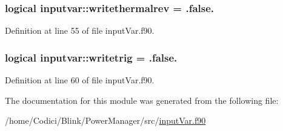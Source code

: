 \hypertarget{classinputvar_ae7817d3a1abb7e02fdd1d3f40b45a4e8}{
\subsubsection[{writethermalrev}]{\setlength{\rightskip}{0pt plus 5cm}logical inputvar\-::writethermalrev = .false.}}\label{classinputvar_ae7817d3a1abb7e02fdd1d3f40b45a4e8}


Definition at line 55 of file input\-Var.\-f90.

\hypertarget{classinputvar_a676701049b4d18d378d94894b1fcae7b}{
\subsubsection[{writetrig}]{\setlength{\rightskip}{0pt plus 5cm}logical inputvar\-::writetrig = .false.}}\label{classinputvar_a676701049b4d18d378d94894b1fcae7b}


Definition at line 60 of file input\-Var.\-f90.



The documentation for this module was generated from the following file\-:\begin{DoxyCompactItemize}
\item 
/home/\-Codici/\-Blink/\-Power\-Manager/src/\hyperlink{input_var_8f90}{input\-Var.\-f90}\end{DoxyCompactItemize}
